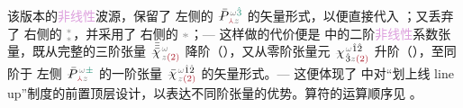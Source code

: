 该版本的\textcolor{Plum}{非线性}\textcolor{NavyBlue}{波源}，保留了  左侧的 $\Xint{\mathcolor{gray}{-}}{25}{\bar{P}}^{\;\! \mathcolor{gray}{\omega} \textcolor{PineGreen}{\hat{3}}}_{\;\! \textcolor{Maroon}{\Yup} \mathcolor{gray}{z}}$ 的矢量形式，以便直接代入 ；又丢弃了  右侧的 ${}^{\mathcolor{gray}{*}}_{\mathcolor{gray}{*}}$，并采用了  右侧的 $\mathcolor{gray}{*}$；--- 这样做的代价便是  中的二阶\textcolor{Plum}{非线性}系数张量，既从完整的三阶张量 $\Xint{{}^{}_{\mathcolor{gray}{-}}}{23}{\bar{\bar{\bar{\chi}}}}^{\;\! \mathcolor{gray}{\omega} }_{\;\! \mathcolor{gray}{z} \textcolor{Maroon}{(2)} }$ 降阶（），又从零阶张量元 $\Xint{{}^{}_{\mathcolor{gray}{-}}}{23}{\chi}^{\;\! \mathcolor{gray}{\omega} \hat{1} \hat{2} }_{\;\! \hat{3} \mathcolor{gray}{z} \textcolor{Maroon}{(2)} }$ 升阶（），至同阶于  左侧 $\Xint{\mathcolor{gray}{-}}{25}{\bar{P}}^{\;\! \mathcolor{gray}{\omega} \textcolor{PineGreen}{\pm}}_{\;\! \textcolor{Maroon}{\Yup} \mathcolor{gray}{z}}$ 的一阶张量 $\Xint{{}^{}_{\mathcolor{gray}{-}}}{23}{\bar{\chi}}^{\;\! \mathcolor{gray}{\omega} \hat{1} \hat{2} }_{\;\! \mathcolor{gray}{z} \textcolor{Maroon}{(2)} }$ 的矢量形式。--- 这便体现了  中对“划上线 line up”制度的前置顶层设计，以表达不同阶张量的优势。算符的运算顺序见 。


